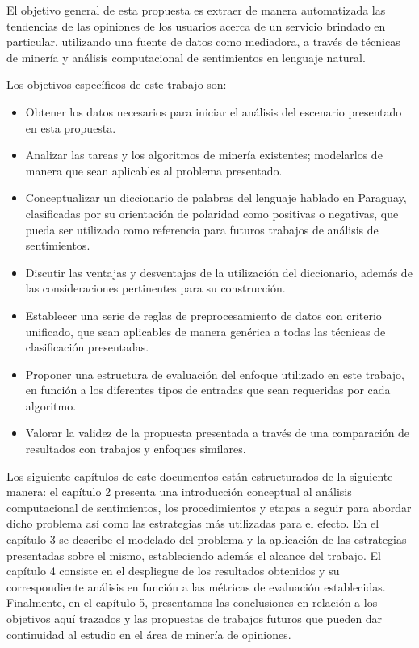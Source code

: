 El objetivo general de esta propuesta es extraer de manera automatizada las tendencias de las  opiniones de los usuarios acerca de un servicio brindado en particular, utilizando una fuente de datos como mediadora, a trav\'es de t\'ecnicas de miner\'ia y an\'alisis computacional de sentimientos en lenguaje natural.
\newline

Los objetivos espec\'ificos de este trabajo son:
\newline
\begin{itemize}
\item Obtener los datos necesarios para iniciar el an\'alisis del escenario presentado en esta propuesta.
\item Analizar las tareas y los algoritmos de miner\'ia existentes; modelarlos de manera que sean aplicables al problema presentado.
\item Conceptualizar un diccionario de palabras del lenguaje hablado en Paraguay, clasificadas por su orientaci\'on de polaridad como positivas o negativas, que pueda ser utilizado como referencia para futuros trabajos de an\'alisis de sentimientos.
\item Discutir las ventajas y desventajas de la utilizaci\'on del diccionario, adem\'as de las consideraciones pertinentes para su construcci\'on.
\item Establecer una serie de reglas de preprocesamiento de datos con criterio unificado, que sean aplicables de manera gen\'erica a todas las t\'ecnicas de clasificaci\'on presentadas. 
\item Proponer una estructura de evaluaci\'on del enfoque utilizado en este trabajo, en funci\'on a los diferentes tipos de entradas que sean requeridas por cada algoritmo.
\item Valorar la validez de la propuesta presentada a trav\'es de una comparaci\'on de resultados con trabajos y enfoques similares.
\end{itemize}

Los siguiente cap\'itulos de este documentos est\'an estructurados de la siguiente manera: el cap\'itulo 2 presenta una introducci\'on conceptual al an\'alisis computacional de sentimientos, los procedimientos y etapas a seguir para abordar dicho problema as\'i como las estrategias m\'as utilizadas para el efecto. En el cap\'itulo 3 se describe el modelado del problema y la aplicaci\'on de las estrategias presentadas sobre el mismo, estableciendo adem\'as el alcance del trabajo. El cap\'itulo 4 consiste en el despliegue de los resultados obtenidos y su correspondiente an\'alisis en funci\'on a las m\'etricas de evaluaci\'on establecidas. Finalmente, en el cap\'itulo 5, presentamos las conclusiones en relaci\'on a los objetivos aqu\'i trazados y las propuestas de trabajos futuros que pueden dar continuidad al estudio en el \'area de miner\'ia de opiniones.
